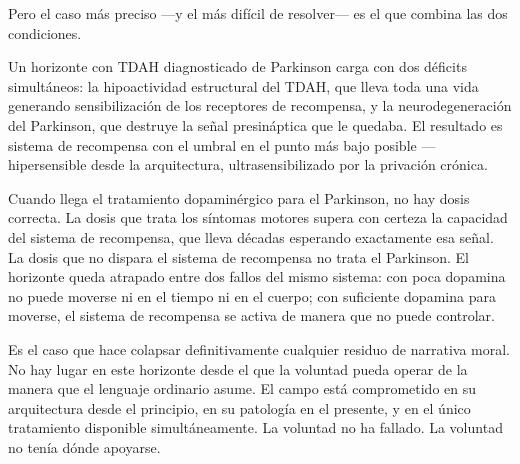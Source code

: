 Pero el caso más preciso —y el más difícil de resolver— es el que combina las dos condiciones.

Un horizonte con TDAH diagnosticado de Parkinson carga con dos déficits simultáneos: la hipoactividad estructural del TDAH, que lleva toda una vida generando sensibilización de los receptores de recompensa, y la neurodegeneración del Parkinson, que destruye la señal presináptica que le quedaba. El resultado es sistema de recompensa con el umbral en el punto más bajo posible —hipersensible desde la arquitectura, ultrasensibilizado por la privación crónica.

Cuando llega el tratamiento dopaminérgico para el Parkinson, no hay dosis correcta. La dosis que trata los síntomas motores supera con certeza la capacidad del sistema de recompensa, que lleva décadas esperando exactamente esa señal. La dosis que no dispara el sistema de recompensa no trata el Parkinson. El horizonte queda atrapado entre dos fallos del mismo sistema: con poca dopamina no puede moverse ni en el tiempo ni en el cuerpo; con suficiente dopamina para moverse, el sistema de recompensa se activa de manera que no puede controlar.

Es el caso que hace colapsar definitivamente cualquier residuo de narrativa moral. No hay lugar en este horizonte desde el que la voluntad pueda operar de la manera que el lenguaje ordinario asume. El campo está comprometido en su arquitectura desde el principio, en su patología en el presente, y en el único tratamiento disponible simultáneamente. La voluntad no ha fallado. La voluntad no tenía dónde apoyarse.

